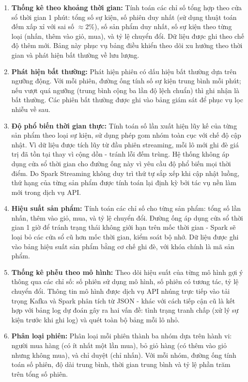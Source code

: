 \documentclass[../BTL.tex]{subfiles}
\begin{document}
\begin{enumerate}
    \item[\textbf{A.}] \textbf{Thống kê theo khoảng thời gian:} Tính toán các chỉ số tổng hợp theo cửa sổ thời gian 1 phút: tổng số sự kiện, số phiên duy nhất (sử dụng thuật toán đếm xấp xỉ với sai số $\approx$2\%), số sản phẩm duy nhất, số sự kiện theo từng loại (nhấn, thêm vào giỏ, mua), và tỷ lệ chuyển đổi. Dữ liệu được ghi theo chế độ thêm mới. Bảng này phục vụ bảng điều khiển theo dõi xu hướng theo thời gian và phát hiện bất thường về lưu lượng.

    \item[\textbf{B.}] \textbf{Phát hiện bất thường:} Phát hiện phiên có dấu hiệu bất thường dựa trên ngưỡng động. Với mỗi phiên, đường ống tính số sự kiện trung bình mỗi phút; nếu vượt quá ngưỡng (trung bình cộng ba lần độ lệch chuẩn) thì ghi nhận là bất thường. Các phiên bất thường được ghi vào bảng giám sát để phục vụ lọc nhiễu về sau.

    \item[\textbf{C.}] \textbf{Độ phổ biến thời gian thực:} Tính toán số lần xuất hiện lũy kế của từng sản phẩm theo loại sự kiện, sử dụng phép gom nhóm toàn cục với chế độ cập nhật. Vì dữ liệu được tích lũy từ đầu phiên streaming, mỗi lô mới ghi đè giá trị đã tồn tại thay vì cộng dồn - tránh lỗi đếm trùng. Hệ thống không áp dụng cửa sổ thời gian cho đường ống này vì yêu cầu độ phổ biến mọi thời điểm. Do Spark Streaming không duy trì thứ tự sắp xếp khi cập nhật luồng, thứ hạng của từng sản phẩm được tính toán lại định kỳ bởi tác vụ nền làm mới trong dịch vụ API.

    \item[\textbf{D.}] \textbf{Hiệu suất sản phẩm:} Tính toán các chỉ số cho từng sản phẩm: tổng số lần nhấn, thêm vào giỏ, mua, và tỷ lệ chuyển đổi. Đường ống áp dụng cửa sổ thời gian 1 giờ để tránh trạng thái không giới hạn trên mốc thời gian - Spark sẽ loại bỏ các cửa sổ cũ hơn mốc thời gian, kiểm soát bộ nhớ. Dữ liệu được ghi vào bảng hiệu suất sản phẩm bằng cơ chế ghi đè, với khóa chính là mã sản phẩm.

    \item[\textbf{E.}] \textbf{Thống kê phễu theo mô hình:} Theo dõi hiệu suất của từng mô hình gợi ý thông qua các chỉ số: số phiên sử dụng mô hình, số phiên có tương tác, tỷ lệ chuyển đổi. Thông tin mô hình được dịch vụ API nhúng trực tiếp vào tải trọng Kafka và Spark phân tích từ JSON - khác với cách tiếp cận cũ là kết hợp với bảng log dự đoán gây ra hai vấn đề: tình trạng tranh chấp (xử lý sự kiện trước khi ghi log) và quét toàn bộ bảng mỗi lô nhỏ.

    \item[\textbf{F.}] \textbf{Phân loại phiên:} Phân loại mỗi phiên thành ba nhóm dựa trên hành vi: người mua hàng (có ít nhất một lần mua), bỏ giỏ hàng (có thêm vào giỏ nhưng không mua), và chỉ duyệt (chỉ nhấn). Với mỗi nhóm, đường ống tính toán số phiên, độ dài trung bình, thời gian trung bình và tỷ lệ phần trăm trên tổng số phiên.
\end{enumerate}
\end{document}
